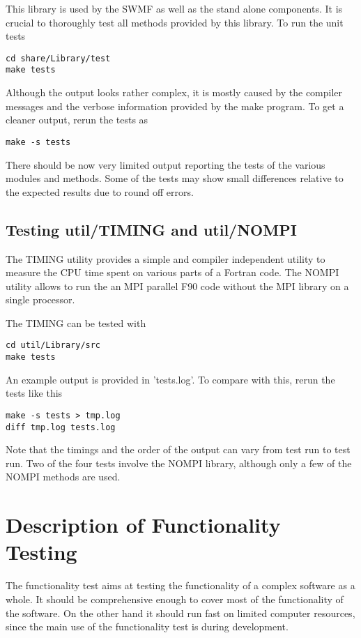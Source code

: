 \documentclass[twoside,10pt]{article}
\begin{document}
This library is used by the SWMF as well as the stand alone components.
It is crucial to thoroughly test all methods provided by this library.
To run the unit tests
\begin{verbatim}
cd share/Library/test
make tests
\end{verbatim}
Although the output looks rather complex, it is mostly caused by the
compiler messages and the verbose information provided by the make
program. To get a cleaner output, rerun the tests as
\begin{verbatim}
make -s tests
\end{verbatim}
There should be now very limited output reporting the tests
of the various modules and methods. Some of the tests may show small
differences relative to the expected results due to round off errors.


\subsection{Testing util/TIMING and util/NOMPI}

The TIMING utility provides a simple and compiler independent utility
to measure the CPU time spent on various parts of a Fortran code.
The NOMPI utility allows to run the an MPI parallel F90 code without 
the MPI library on a single processor.

The TIMING can be tested with
\begin{verbatim}
cd util/Library/src
make tests
\end{verbatim}
An example output is provided in 'tests.log'. To compare with this,
rerun the tests like this
\begin{verbatim}
make -s tests > tmp.log
diff tmp.log tests.log
\end{verbatim}
Note that the timings and the order of the output can vary from
test run to test run. Two of the four tests involve the NOMPI
library, although only a few of the NOMPI methods are used.

\section{Description of Functionality Testing}

The functionality test aims at testing the functionality of 
a complex software as a whole. It should be comprehensive enough
to cover most of the functionality of the software. On the
other hand it should run fast on limited computer resources,
since the main use of the functionality test is during development.
\end{document}
